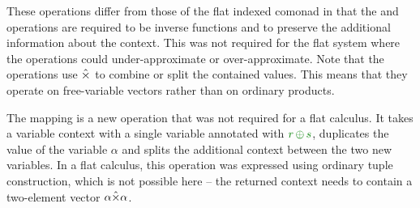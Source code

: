 \noindent
These operations differ from those of the flat indexed comonad in that the  and
 operations are required to be inverse functions and to preserve the additional
information about the context. This was not required for the flat system where the operations
could under-approximate or over-approximate. Note that the operations use $\hat{\times}$ to combine
or split the contained values. This means that they operate on free-variable vectors rather than
on ordinary products.

The  mapping is a new operation that was not required for a flat calculus. It
takes a variable context with a single variable annotated with $\cclrd{r}\,\cpar\,\cclrd{s}$,
duplicates the value of the variable $\alpha$ and splits the additional context between the two
new variables. In a flat calculus, this operation was expressed using ordinary tuple
construction, which is not possible here -- the returned context needs to contain a
two-element vector $\alpha \hat{\times} \alpha$.


